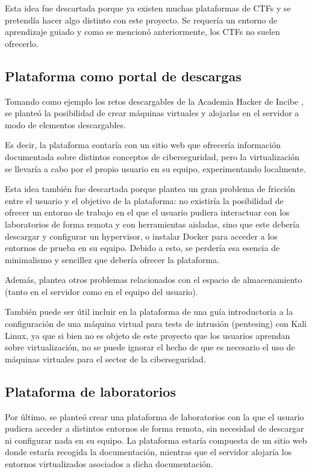             Esta idea fue descartada porque ya existen muchas plataformas de CTFs y se pretendía hacer algo distinto con este proyecto. Se requería un entorno de aprendizaje guiado y como se mencionó anteriormente, los CTFs no suelen ofrecerlo.

        \subsection{Plataforma como portal de descargas}

            Tomando como ejemplo los retos descargables de la Academia Hacker de Incibe \cite{retos-INCIBE}, se planteó la posibilidad de crear máquinas virtuales y alojarlas en el servidor a modo de elementos descargables.
            
            Es decir, la plataforma contaría con un sitio web que ofrecería información documentada sobre distintos conceptos de ciberseguridad, pero la virtualización se llevaría a cabo por el propio usuario en su equipo, experimentando localmente.

            Esta idea también fue descartada porque plantea un gran problema de fricción entre el usuario y el objetivo de la plataforma: no existiría la posibilidad de ofrecer un entorno de trabajo en el que el usuario pudiera interactuar con los laboratorios de forma remota y con herramientas aisladas, sino que este debería descargar y configurar un hypervisor, o instalar Docker para acceder a los entornos de prueba en su equipo. Debido a esto, se perdería esa esencia de minimalismo y sencillez que debería ofrecer la plataforma.
            
            Además, plantea otros problemas relacionados con el espacio de almacenamiento (tanto en el servidor como en el equipo del usuario).
            
            También puede ser útil incluir en la plataforma de una guía introductoria a la configuración de una máquina virtual para tests de intrusión (pentesing) con Kali Linux, ya que si bien no es objeto de este proyecto que los usuarios aprendan sobre virtualización, no se puede ignorar el hecho de que es necesario el uso de máquinas virtuales para el sector de la ciberseguridad.

        \subsection{Plataforma de laboratorios}

            Por último, se planteó crear una plataforma de laboratorios con la que el usuario pudiera acceder a distintos entornos de forma remota, sin necesidad de descargar ni configurar nada en su equipo. La plataforma estaría compuesta de un sitio web donde estaría recogida la documentación, mientras que el servidor alojaría los entornos virtualizados asociados a dicha documentación.
            
